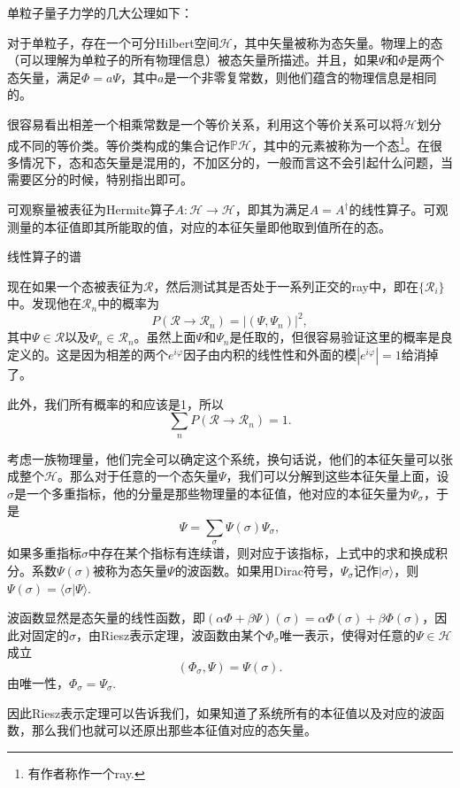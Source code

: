\documentclass[9pt]{extbook}
\begin{document}
单粒子量子力学的几大公理如下：

 对于单粒子，存在一个可分Hilbert空间$\mathcal{H}$，其中矢量被称为态矢量。物理上的态（可以理解为单粒子的所有物理信息）被态矢量所描述。并且，如果$\Psi$和$\Phi$是两个态矢量，满足$\Phi = a \Psi$，其中$a$是一个非零复常数，则他们蕴含的物理信息是相同的。



很容易看出相差一个相乘常数是一个等价关系，利用这个等价关系可以将$\mathcal{H}$划分成不同的等价类。等价类构成的集合记作$\mathbb{P}\mathcal{H}$，其中的元素被称为一个态\footnote{有作者称作一个ray.}。在很多情况下，态和态矢量是混用的，不加区分的，一般而言这不会引起什么问题，当需要区分的时候，特别指出即可。

 可观察量被表征为Hermite算子$A:\mathcal{H}\to\mathcal{H}$，即其为满足$A=A^{\dag}$的线性算子。可观测量的本征值即其所能取的值，对应的本征矢量即他取到值所在的态。

线性算子的谱

 现在如果一个态被表征为$\mathscr{R}$，然后测试其是否处于一系列正交的ray中，即在$\{\mathscr{R}_i\}$中。发现他在$\mathscr{R}_n$中的概率为
\[
P(\mathscr{R}\to\mathscr{R}_n)=|(\Psi,\Psi_n)|^2,
\]
其中$\Psi\in \mathscr{R}$以及$\Psi_n\in \mathscr{R}_n$。虽然上面$\Psi$和$\Psi_n$是任取的，但很容易验证这里的概率是良定义的。这是因为相差的两个$e^{i\varphi}$因子由内积的线性性和外面的模$|e^{i\varphi}|=1$给消掉了。

此外，我们所有概率的和应该是1，所以
\[
\sum_n P(\mathscr{R}\to\mathscr{R}_n)=1.
\]

考虑一族物理量，他们完全可以确定这个系统，换句话说，他们的本征矢量可以张成整个$\mathcal{H}$。那么对于任意的一个态矢量$\Psi$，我们可以分解到这些本征矢量上面，设$\sigma$是一个多重指标，他的分量是那些物理量的本征值，他对应的本征矢量为$\Psi_\sigma$，于是
\[
	\Psi=\sum_{\sigma}\Psi(\sigma)\Psi_\sigma,
\]
如果多重指标$\sigma$中存在某个指标有连续谱，则对应于该指标，上式中的求和换成积分。系数$\Psi(\sigma)$被称为态矢量$\Psi$的波函数。如果用Dirac符号，$\Psi_\sigma$记作$|\sigma\rangle$，则$\Psi(\sigma)=\langle \sigma|\Psi\rangle$.

波函数显然是态矢量的线性函数，即$(\alpha\Phi+\beta\Psi)(\sigma)=\alpha\Phi(\sigma)+\beta\Phi(\sigma)$，因此对固定的$\sigma$，由Riesz表示定理，波函数由某个$\Phi_\sigma$唯一表示，使得对任意的$\Psi\in \mathcal{H}$成立
\[
	(\Phi_\sigma,\Psi)=\Psi(\sigma).
\]
由唯一性，$\Phi_\sigma=\Psi_\sigma$.

因此Riesz表示定理可以告诉我们，如果知道了系统所有的本征值以及对应的波函数，那么我们也就可以还原出那些本征值对应的态矢量。
\end{document}
